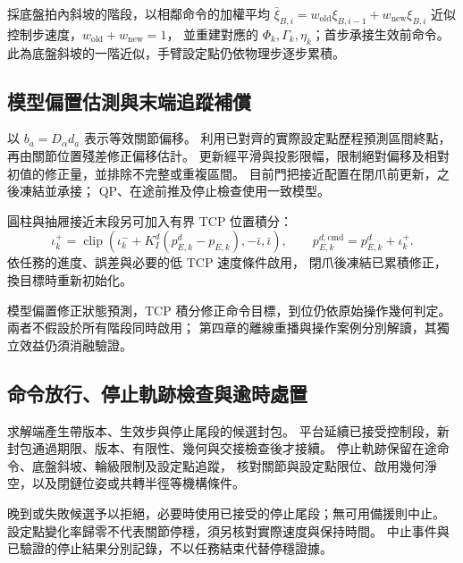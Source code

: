 採底盤拍內斜坡的階段，以相鄰命令的加權平均
$\bar\xi_{B,i}=w_{\mathrm{old}}\xi_{B,i-1}+w_{\mathrm{new}}\xi_{B,i}$
近似控制步速度，$w_{\mathrm{old}}+w_{\mathrm{new}}=1$，
並重建對應的 $\Phi_k,\Gamma_k,\eta_k$；首步承接生效前命令。
此為底盤斜坡的一階近似，手臂設定點仍依物理步逐步累積。

\subsection{模型偏置估測與末端追蹤補償}
\label{subsec:model_bias_tcp_compensation}

以 $b_a=D_\alpha d_a$ 表示等效關節偏移。
利用已對齊的實際設定點歷程預測區間終點，再由關節位置殘差修正偏移估計。
更新經平滑與投影限幅，限制絕對偏移及相對初值的修正量，並排除不完整或重複區間。
目前門把接近配置在閉爪前更新，之後凍結並承接；
QP、在途前推及停止檢查使用一致模型。

圓柱與抽屜接近末段另可加入有界 TCP 位置積分：
\begin{equation}
    \iota_k^+=\operatorname{clip}
    (\iota_k^-+K_I^d(p_{E,k}^d-p_{E,k}),-\bar\iota,\bar\iota),
    \qquad
    p_{E,k}^{d,\mathrm{cmd}}=p_{E,k}^d+\iota_k^+ .
    \label{eq:ch3_bounded_tcp_target_compensation}
\end{equation}
依任務的進度、誤差與必要的低 TCP 速度條件啟用，
閉爪後凍結已累積修正，換目標時重新初始化。

模型偏置修正狀態預測，TCP 積分修正命令目標，到位仍依原始操作幾何判定。
兩者不假設於所有階段同時啟用；
第四章的離線重播與操作案例分別解讀，其獨立效益仍須消融驗證。

\subsection{命令放行、停止軌跡檢查與逾時處置}
\label{subsec:command_acceptance_stopping}

求解端產生帶版本、生效步與停止尾段的候選封包。
平台延續已接受控制段，新封包通過期限、版本、有限性、幾何與交接檢查後才接續。
停止軌跡保留在途命令、底盤斜坡、輪級限制及設定點追蹤，
核對關節與設定點限位、啟用幾何淨空，以及閉鏈位姿或共轉半徑等機構條件。

晚到或失敗候選予以拒絕，必要時使用已接受的停止尾段；無可用備援則中止。
設定點變化率歸零不代表關節停穩，須另核對實際速度與保持時間。
中止事件與已驗證的停止結果分別記錄，不以任務結束代替停穩證據。

